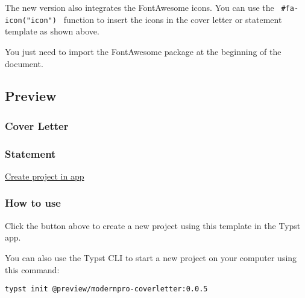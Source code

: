 The new version also integrates the FontAwesome icons. You can use the
\texttt{\ \#fa-icon("icon")\ } function to insert the icons in the cover
letter or statement template as shown above.

You just need to import the FontAwesome package at the beginning of the
document.

\begin{Shaded}
\begin{Highlighting}[]
\end{Highlighting}
\end{Shaded}

\subsection{Preview}\label{preview}

\subsubsection{Cover Letter}\label{cover-letter-1}


\subsubsection{Statement}\label{statement-1}


\href{/app?template=modernpro-coverletter&version=0.0.5}{Create project
in app}

\subsubsection{How to use}\label{how-to-use-1}

Click the button above to create a new project using this template in
the Typst app.

You can also use the Typst CLI to start a new project on your computer
using this command:

\begin{verbatim}
typst init @preview/modernpro-coverletter:0.0.5
\end{verbatim}



